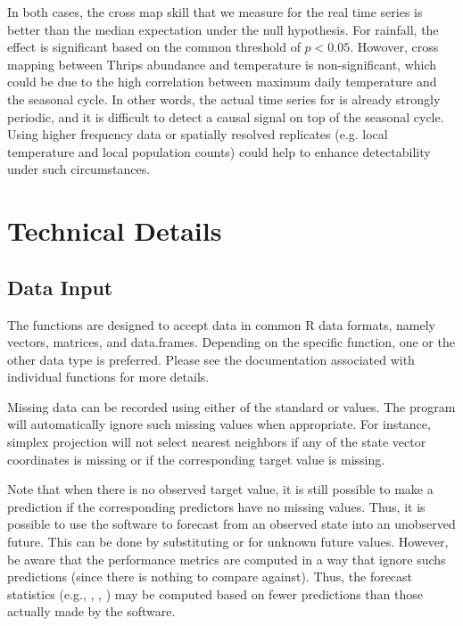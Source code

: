 \documentclass[article]{jss}
\begin{document}
In both cases, the cross map skill that we measure for the real time series is better than the median expectation under the null hypothesis. For rainfall, the effect is significant based on the common threshold of $p < 0.05$. Howover, cross mapping between Thrips abundance and temperature is non-significant, which could be due to the high correlation between maximum daily temperature and the seasonal cycle. In other words, the actual time series for  is already strongly periodic, and it is difficult to detect a causal signal on top of the seasonal cycle. Using higher frequency data or spatially resolved replicates (e.g. local temperature and local population counts) could help to enhance detectability under such circumstances.

\section{Technical Details}\label{sec:technical-details}

\subsection{Data Input}\label{sec:data-input}

The  functions are designed to accept data in common R data formats, namely vectors, matrices, and data.frames. Depending on the specific function, one or the other data type is preferred. Please see the documentation associated with individual functions for more details.

Missing data can be recorded using either of the standard  or  values. The program will automatically ignore such missing values when appropriate. For instance, simplex projection will not select nearest neighbors if any of the state vector coordinates is missing or if the corresponding target value is missing.

Note that when there is no observed target value, it is still possible to make a prediction if the corresponding predictors have no missing values. Thus, it is possible to use the software to forecast from an observed state into an unobserved future. This can be done by substituting  or  for unknown future values. However, be aware that the performance metrics are computed in a way that ignore suchs predictions (since there is nothing to compare against). Thus, the forecast statistics (e.g., , , ) may be computed based on fewer predictions than those actually made by the software.
\end{document}
